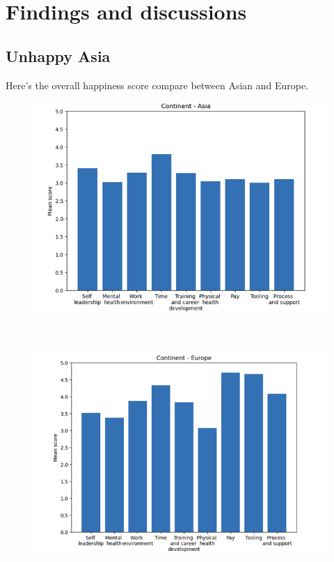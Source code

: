 \documentclass[12pt]{article}
\begin{document}
\section*{Findings and discussions}

\subsection*{Unhappy Asia}

Here’s the overall happiness score compare between Asian and Europe.

\begin{figure}[h]
    \centering
    \includegraphics[scale=1]{asia.png}
    \label{asia}
\end{figure} \\

\begin{figure}[h]
    \centering
    \includegraphics[scale=1]{europe.png}
    \label{europe}
\end{figure} 
\end{document}
